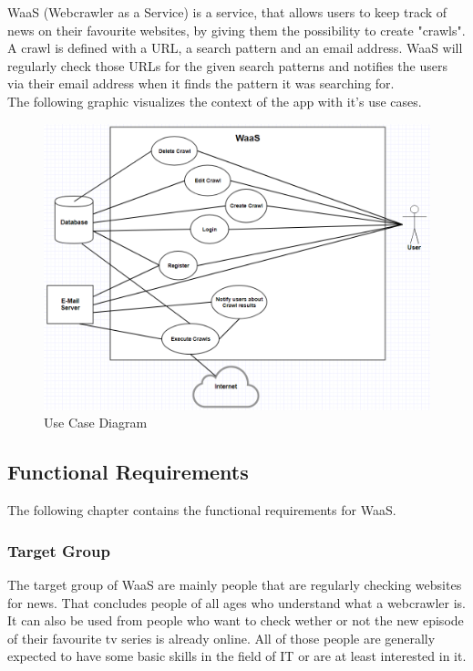 \documentclass[titlepage, 12pt]{article}
\begin{document}
WaaS (Webcrawler as a Service) is a service, that allows users to keep track of news on their favourite websites, by giving them the possibility to create "crawls". A crawl is defined with a URL, a search pattern and an email address. WaaS will regularly check those URLs for the given search patterns and notifies the users via their email address when it finds the pattern it was searching for.
\medskip \\
The following graphic visualizes the context of the app with it's use cases.
\begin{figure}[H]
  \includegraphics[width=\linewidth]{UseCaseDiagram.PNG}
  \caption{Use Case Diagram}
  \label{fig:useCaseDiagram}
\end{figure}

\subsection{Functional Requirements}

The following chapter contains the functional requirements for WaaS.

\subsubsection{Target Group}

The target group of WaaS are mainly people that are regularly checking websites for news. That concludes people of all ages who understand what a webcrawler is. It can also be used from people who want to check wether or not the new episode of their favourite tv series is already online. All of those people are generally expected to have some basic skills in the field of IT or are at least interested in it.
\end{document}

